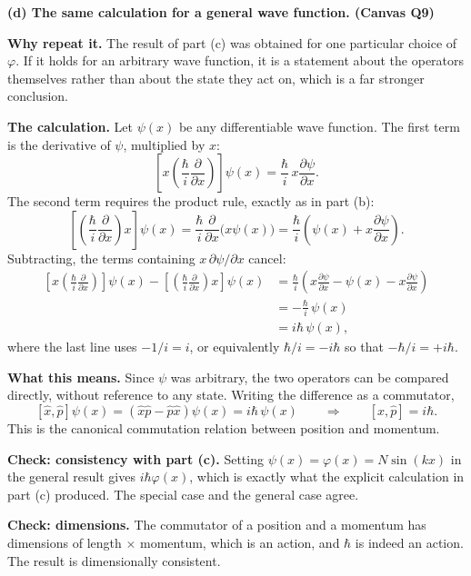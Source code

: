 \documentclass[12pt]{article}
\newcommand{\problemsep}{\vspace{0.8em}}
\begin{document}
\begin{solutionbox}
\problemsep
\textbf{(d) The same calculation for a general wave function. \hfill (Canvas Q9)}

\textbf{Why repeat it.} The result of part (c) was obtained for one particular choice of $\varphi$. If it holds for an arbitrary wave function, it is a statement about the operators themselves rather than about the state they act on, which is a far stronger conclusion.

\textbf{The calculation.} Let $\psi(x)$ be any differentiable wave function. The first term is the derivative of $\psi$, multiplied by $x$:
\[
    \left[x\left(\frac{\hbar}{i}\frac{\partial}{\partial x}\right)\right]\psi(x)
    =\frac{\hbar}{i}\,x\frac{\partial \psi}{\partial x}.
\]
The second term requires the product rule, exactly as in part (b):
\[
    \left[\left(\frac{\hbar}{i}\frac{\partial}{\partial x}\right)x\right]\psi(x)
    =\frac{\hbar}{i}\frac{\partial}{\partial x}\Big(x\psi(x)\Big)
    =\frac{\hbar}{i}\left(\psi(x)+x\frac{\partial \psi}{\partial x}\right).
\]
Subtracting, the terms containing $x\,\partial\psi/\partial x$ cancel:
\begin{align*}
    \left[x\left(\frac{\hbar}{i}\frac{\partial}{\partial x}\right)\right]\psi(x)
    -\left[\left(\frac{\hbar}{i}\frac{\partial}{\partial x}\right)x\right]\psi(x)
    &=\frac{\hbar}{i}\left(x\frac{\partial \psi}{\partial x}-\psi(x)-x\frac{\partial \psi}{\partial x}\right)\\[0.3em]
    &=-\frac{\hbar}{i}\,\psi(x)\\[0.3em]
    &=i\hbar\,\psi(x),
\end{align*}
where the last line uses $-1/i=i$, or equivalently $\hbar/i=-i\hbar$ so that $-\hbar/i=+i\hbar$.

\textbf{What this means.} Since $\psi$ was arbitrary, the two operators can be compared directly, without reference to any state. Writing the difference as a commutator,
\[
    \left[\hat{x},\hat{p}\right]\psi(x)
    =\left(\hat{x}\hat{p}-\hat{p}\hat{x}\right)\psi(x)
    =i\hbar\,\psi(x)
    \qquad\Longrightarrow\qquad
    \left[\hat{x},\hat{p}\right]=i\hbar .
\]
This is the canonical commutation relation between position and momentum.

\textbf{Check: consistency with part (c).} Setting $\psi(x)=\varphi(x)=N\sin(kx)$ in the general result gives $i\hbar\varphi(x)$, which is exactly what the explicit calculation in part (c) produced. The special case and the general case agree.

\textbf{Check: dimensions.} The commutator of a position and a momentum has dimensions of length $\times$ momentum, which is an action, and $\hbar$ is indeed an action. The result is dimensionally consistent.
\end{solutionbox}
\end{document}
